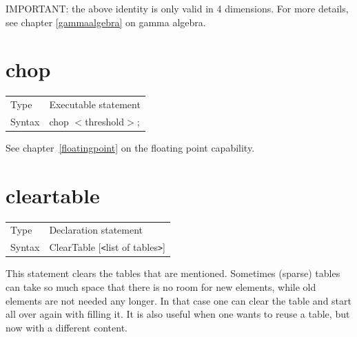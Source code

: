 

\noindent IMPORTANT: the above identity is only valid in 4 dimensions. For 
more details, see chapter \ref{gammaalgebra} on gamma algebra. \vspace{10mm}

\section{chop}
\label{substachop}

\noindent \begin{tabular}{ll}
Type & Executable statement\\
Syntax & chop $<$threshold$>$; \\ 
\end{tabular} \vspace{4mm}

\noindent See chapter~\ref{floatingpoint} on the floating point capability.
 

\section{cleartable}
\label{substacleartable}

\noindent \begin{tabular}{ll}
Type & Declaration statement\\
Syntax & ClearTable [{\tt<}list of tables{\tt>}]
\end{tabular} \vspace{4mm}

\noindent This statement clears the tables that are mentioned. Sometimes 
(sparse) tables can take so much space that there is no room for new 
elements, while old elements are not needed any longer. In that case one 
can clear the table and start all over again with filling it. It is also 
useful when one wants to reuse a table, but now with a different content.
\vspace{10mm}

